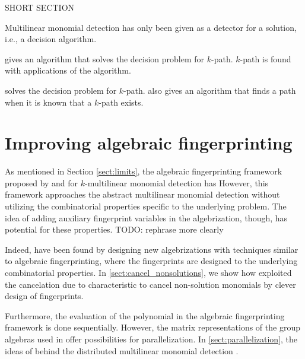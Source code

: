 SHORT SECTION

Multilinear monomial detection has only been given as a detector for a solution,
i.e., a decision algorithm. 

\cite{Koutis08} gives an algorithm that solves the decision problem for $k$-path. 
$k$-path is found with  applications of the algorithm.

\cite{Williams09} solves the decision problem for $k$-path. \cite{Williams09} also gives an algorithm 
that finds a path when it is known that a $k$-path exists.

\clearpage

\section{Improving algebraic fingerprinting}

As mentioned in Section \ref{sect:limits}, the algebraic fingerprinting framework proposed by 
\citeauthor{Koutis08} and \citeauthor{Williams09} \cite{Williams09, KouWil15} for 
$k$-multilinear monomial detection has
However, this framework 
approaches the abstract multilinear monomial detection without 
utilizing the combinatorial properties specific to the underlying problem. 
The idea of adding auxiliary fingerprint variables in the algebrization, though, 
has potential for these properties. TODO: rephrase more clearly

Indeed,
 have been found by designing new algebrizations with techniques 
similar to algebraic fingerprinting, where the fingerprints are designed to 
the underlying combinatorial properties. In \cref{sect:cancel_nonsolutions}, 
we show how \citeauthor{Björklund14} \cite{Björklund14}
exploited the cancelation due to characteristic to cancel non-solution monomials 
by clever design of fingerprints. 

Furthermore, the evaluation of the polynomial in the algebraic fingerprinting framework is done sequentially. 
However, the matrix representations of the group algebras used in \cite{Williams09} 
offer possibilities for parallelization.
In \cref{sect:parallelization},  the ideas of 
\citeauthor{Midas19} behind the distributed multilinear monomial detection
\cite{Midas19} .

